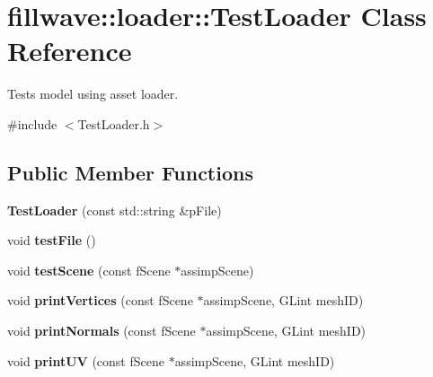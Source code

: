 \hypertarget{classfillwave_1_1loader_1_1TestLoader}{}\section{fillwave\+:\+:loader\+:\+:Test\+Loader Class Reference}
\label{classfillwave_1_1loader_1_1TestLoader}


Tests model using asset loader.  




{\ttfamily \#include $<$Test\+Loader.\+h$>$}

\subsection*{Public Member Functions}
\begin{DoxyCompactItemize}
\item 
\hypertarget{classfillwave_1_1loader_1_1TestLoader_a85f7e187c3359875f0583c64969969c8}{}{\bfseries Test\+Loader} (const std\+::string \&p\+File)\label{classfillwave_1_1loader_1_1TestLoader_a85f7e187c3359875f0583c64969969c8}

\item 
\hypertarget{classfillwave_1_1loader_1_1TestLoader_a1d5091f75ccc18fb0a485268bbef4711}{}void {\bfseries test\+File} ()\label{classfillwave_1_1loader_1_1TestLoader_a1d5091f75ccc18fb0a485268bbef4711}

\item 
\hypertarget{classfillwave_1_1loader_1_1TestLoader_a8098cdca10db9e382f8e9d39f34b1fa6}{}void {\bfseries test\+Scene} (const f\+Scene $\ast$assimp\+Scene)\label{classfillwave_1_1loader_1_1TestLoader_a8098cdca10db9e382f8e9d39f34b1fa6}

\item 
\hypertarget{classfillwave_1_1loader_1_1TestLoader_a9f7c68861b2258d3183d8ed8227731b3}{}void {\bfseries print\+Vertices} (const f\+Scene $\ast$assimp\+Scene, G\+Lint mesh\+I\+D)\label{classfillwave_1_1loader_1_1TestLoader_a9f7c68861b2258d3183d8ed8227731b3}

\item 
\hypertarget{classfillwave_1_1loader_1_1TestLoader_af4dca785f7c478aa785992940e7e1b59}{}void {\bfseries print\+Normals} (const f\+Scene $\ast$assimp\+Scene, G\+Lint mesh\+I\+D)\label{classfillwave_1_1loader_1_1TestLoader_af4dca785f7c478aa785992940e7e1b59}

\item 
\hypertarget{classfillwave_1_1loader_1_1TestLoader_a21520efb5f9d05746802e8af12a0b3de}{}void {\bfseries print\+U\+V} (const f\+Scene $\ast$assimp\+Scene, G\+Lint mesh\+I\+D)\label{classfillwave_1_1loader_1_1TestLoader_a21520efb5f9d05746802e8af12a0b3de}


\end{DoxyCompactItemize}

